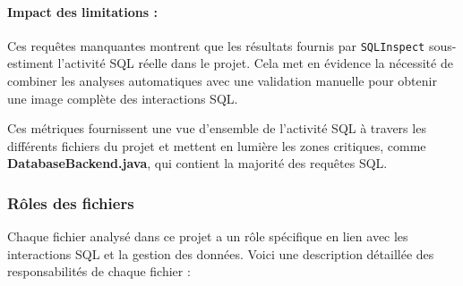 \documentclass[a4paper,11pt]{article}
\begin{document}
\paragraph{Impact des limitations :}
Ces requêtes manquantes montrent que les résultats fournis par \texttt{SQLInspect} sous-estiment l'activité SQL réelle dans le projet. Cela met en évidence la nécessité de combiner les analyses automatiques avec une validation manuelle pour obtenir une image complète des interactions SQL.


Ces métriques fournissent une vue d'ensemble de l'activité SQL à travers les différents fichiers du projet et mettent en lumière les zones critiques, comme \textbf{DatabaseBackend.java}, qui contient la majorité des requêtes SQL.

\subsubsection*{Rôles des fichiers}

Chaque fichier analysé dans ce projet a un rôle spécifique en lien avec les interactions SQL et la gestion des données. Voici une description détaillée des responsabilités de chaque fichier :
\end{document}

